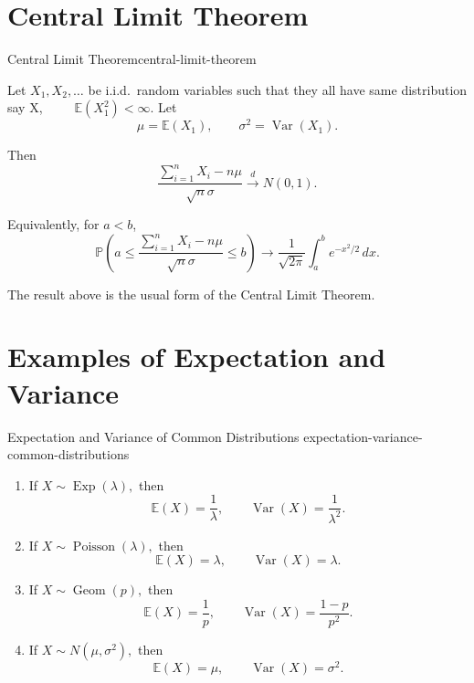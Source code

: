 \section{Central Limit Theorem}

\begin{theorem}{Central Limit Theorem}{central-limit-theorem}

Let
\(
X_1,X_2,\ldots
\)
be i.i.d.\ random variables such that they  all have same distribution say X,~ ~ ~ 
\(
\mathbb{E}(X_1^2)<\infty.
\)
Let
\[
\mu=\mathbb{E}(X_1),
\qquad
\sigma^2=\operatorname{Var}(X_1).
\]

Then
\[
\frac{
\displaystyle
\sum_{i=1}^n X_i-n\mu
}{
\sqrt{n}\sigma
}
\xrightarrow{d}
N(0,1).
\]

Equivalently, for $a<b$,
\[
\mathbb{P}
\left(
a
\leq
\frac{
\displaystyle\sum_{i=1}^n X_i-n\mu
}{
\sqrt{n}\sigma
}
\leq b
\right)
\longrightarrow
\frac{1}{\sqrt{2\pi}}
\int_a^b e^{-x^2/2}\,dx.
\]

\end{theorem}

\begin{remark}
The result above is the usual form of the Central Limit Theorem.
\end{remark}


\section{Examples of Expectation and Variance}

\begin{example}{Expectation and Variance of Common Distributions}
{expectation-variance-common-distributions}

\begin{enumerate}

    \item If
    \(
    X\sim\operatorname{Exp}(\lambda),
    \)
    then
    \[
    \mathbb{E}(X)=\frac{1}{\lambda},
    \qquad
    \operatorname{Var}(X)=\frac{1}{\lambda^2}.
    \]

    \item If
    \(
    X\sim\operatorname{Poisson}(\lambda),
    \)
    then
    \[
    \mathbb{E}(X)=\lambda,
    \qquad
    \operatorname{Var}(X)=\lambda.
    \]

    \item If
    \(
    X\sim\operatorname{Geom}(p),
    \)
    then
    \[
    \mathbb{E}(X)=\frac{1}{p},
    \qquad
    \operatorname{Var}(X)
    =
    \frac{1-p}{p^2}.
    \]

    \item If
    \(
    X\sim N(\mu,\sigma^2),
    \)
    then
    \[
    \mathbb{E}(X)=\mu,
    \qquad
    \operatorname{Var}(X)=\sigma^2.
    \]

\end{enumerate}

\end{example}


